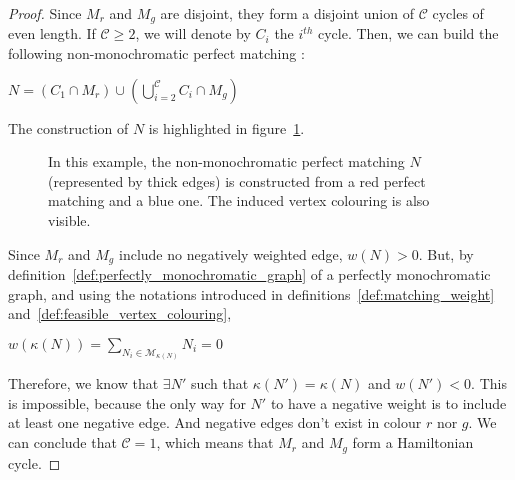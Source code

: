 \begin{proof}
    Since $M_r$ and $M_g$ are disjoint, they form a disjoint union of $\mathcal{C}$ cycles of even length.
    If $\mathcal{C} \geq 2$, we will denote by $C_i$ the $i^{th}$ cycle.
    Then, we can build the following non-monochromatic perfect matching :
    \begin{center}
        $N = (C_1 \cap M_r) \cup \left(\bigcup\limits_{i=2}^{\mathcal{C}} C_i \cap M_g\right)$
    \end{center}

    The construction of $N$ is highlighted in figure~\ref{fig:demo_unique_neg_ham}.

    \begin{figure}[H]
        \caption{In this example, the non-monochromatic perfect matching $N$ (represented by thick edges) is constructed from a red perfect matching and a blue one. The induced vertex colouring is also visible.}
        \label{fig:demo_unique_neg_ham}
    \end{figure}

    Since $M_r$ and $M_g$ include no negatively weighted edge, $w(N) > 0$.
    But, by definition~\ref{def:perfectly_monochromatic_graph} of a perfectly monochromatic graph, and using the notations introduced in definitions~\ref{def:matching_weight} and~\ref{def:feasible_vertex_colouring},

    \begin{center}
        $w(\kappa(N)) = \sum\limits_{N_i \in \mathcal{M}_{\kappa(N)}} N_i = 0$
    \end{center}

    Therefore, we know that $\exists N'$ such that $\kappa(N') = \kappa(N)$ and $w(N') < 0$.
    This is impossible, because the only way for $N'$ to have a negative weight is to include at least one negative edge.
    And negative edges don't exist in colour $r$ nor $g$.
    We can conclude that $\mathcal{C} = 1$, which means that $M_r$ and $M_g$ form a Hamiltonian cycle.
\end{proof}

